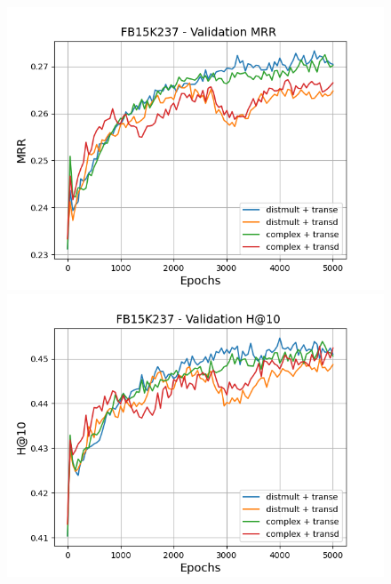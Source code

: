 \begin{figure}
    \centering
    \begin{minipage}{.5\textwidth}
      \centering
      \includegraphics[width=\linewidth]{figures/results/gan_train/pretrained/random/fb15k237/gan_train_random_fb15k237_mrrs.png}
    \end{minipage}%
    \begin{minipage}{.5\textwidth}
      \centering
      \includegraphics[width=\linewidth]{figures/results/gan_train/pretrained/random/fb15k237/gan_train_random_fb15k237_hit10s.png}
    \end{minipage}
    

\end{figure}
